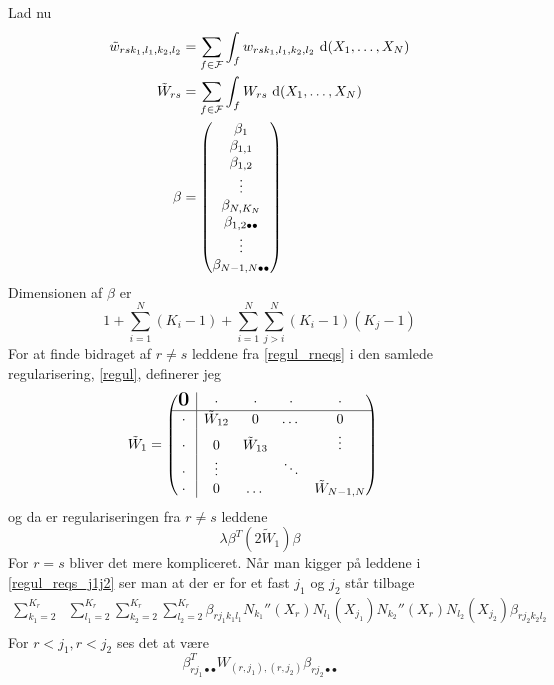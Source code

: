 \documentclass[a4paper, 12pt]{memoir}
\newcommand{\bigzero}{\mbox{\normalfont\Large\bfseries 0}}
\newcommand{\rvline}{\hspace*{-\arraycolsep}\vline\hspace*{-\arraycolsep}}
\begin{document}
Lad nu 
\begin{align}
\tilde w_{rsk_1,l_1,k_2,l_2}&= \sum_{f\in \mathcal F} \int_f w_{rsk_1,l_1,k_2,l_2} \textup{ d}(X_1, \dots, X_N)\\
\tilde W_{rs}&=\sum_{f\in \mathcal F} \int_f W_{rs} \textup{ d}(X_1, \dots, X_N)\\
\beta&= \begin{pmatrix}
\beta_1\\
\beta_{1,1}\\
\beta_{1,2}\\
\vdots\\
\beta_{N,K_N}\\
 \beta_{1,2\bullet\bullet}\\
  \vdots\\
   \beta_{N-1,N\bullet\bullet}
\end{pmatrix}
\end{align}
Dimensionen af \(\beta\) er 
\begin{equation*}
1+\sum_{i=1}^N(K_i-1)+\sum_{i=1}^N\sum_{j>i}^N (K_i-1)(K_j-1)
\end{equation*}
For at finde bidraget af $r\neq s$ leddene fra \eqref{regul_rneqs}  i den samlede regularisering, \eqref{regul}, definerer jeg
\begin{align}
\tilde W_1&=\begin{pmatrix}
\bigzero &\rvline &\cdot&\cdot&\cdot&\cdot\\
\hline
\cdot & \rvline& \tilde W_{12} &0 & \dots & 0 \\
\cdot & \rvline&0 & \tilde W_{13} &  & \vdots \\
\cdot &\rvline & \vdots &&\ddots &\\
\cdot & \rvline & 0 &\dots & & \tilde W_{N-1,N}
\end{pmatrix}
\end{align}
og da er regulariseringen fra $r\neq s$ leddene
\begin{equation}
\lambda \beta^T (2\tilde W_1) \beta
\end{equation}
For $r=s$ bliver det mere kompliceret. Når man kigger på leddene i \eqref{regul_reqs_j1j2} ser man at der er for et fast $j_1$ og $j_2$ står tilbage
\begin{align*}
\sum_{k_1=2}^{K_r}&\sum_{l_1=2}^{K_r} \sum_{k_2=2}^{K_r}\sum_{l_2=2}^{K_r}
\beta_{rj_1k_1l_1} N_{k_1}''(X_r)N_{l_1}(X_{j_1})  N_{k_2}''(X_r)N_{l_2}(X_{j_2})\beta_{rj_2k_2l_2}\\
\end{align*}
For $r<j_1, r<j_2$ ses det at være
\begin{equation}
\beta_{rj_1\bullet \bullet}^T W_{(r,j_1),(r,j_2)} \beta_{rj_2\bullet\bullet}
\end{equation}
\end{document}
